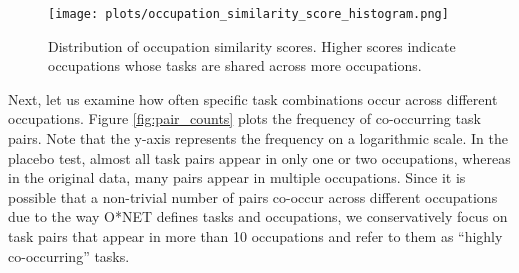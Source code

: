 \documentclass{article}
\theoremstyle{plain}
\theoremstyle{plain}
\begin{document}
\begin{figure}[htbp]
  \centering
  \texttt{[image: plots/occupation\_similarity\_score\_histogram.png]}
  \caption{Distribution of occupation similarity scores. Higher scores indicate occupations whose tasks are shared across more occupations.}
  \label{fig:occ_similarity}
\end{figure}




Next, let us examine how often specific task combinations occur across different occupations. 
Figure \ref{fig:pair_counts} plots the frequency of co-occurring task pairs. 
Note that the y-axis represents the frequency on a logarithmic scale. 
In the placebo test, almost all task pairs appear in only one or two occupations, whereas in the original data, many pairs appear in multiple occupations. 
Since it is possible that a non-trivial number of pairs co-occur across different occupations due to the way O*NET defines tasks and occupations, we conservatively focus on task pairs that appear in more than 10 occupations and refer to them as “highly co-occurring” tasks.
\end{document}
